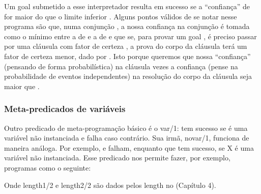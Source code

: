 \documentclass{article}
\begin{document}


Um goal  submetido a esse interpretador resulta em sucesso se a ``confiança''  de 
for maior do que o limite inferior . Alguns pontos válidos de se notar nesse programa são que, numa conjunção ,
a nossa confiança na conjunção é tomada como o mínimo entre a de  e a de  e que se, para provar um goal , é
preciso passar por uma cláusula com fator de certeza , a prova do corpo da cláusula terá um fator de certeza menor, dado
por . Isto porque queremos que nossa ``confiança'' (pensando de forma probabilística)  na cláusula vezes
a confiança  (pense na probabilidade de eventos independentes) na resolução do corpo da cláusula seja maior que .

\subsubsection{Meta-predicados de variáveis}

Outro predicado de meta-programação básico é o var/1:  tem sucesso se  é uma variável não instanciada e falha caso contrário. Sua irmã, novar/1, funciona de maneira análoga. Por exemplo,  e  falham, enquanto que  tem sucesso, se X é uma variável não instanciada.
Esse predicado nos permite fazer, por exemplo, programas como o seguinte:



Onde length1/2 e length2/2 são dados pelos length no (Capítulo 4).
\end{document}
